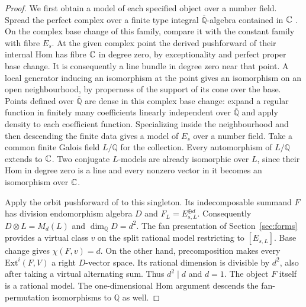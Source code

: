 \begin{proof}
We first obtain a model of each specified object over a number field. Spread the perfect complex over a finite type integral $\overline{\mathbb Q}$-algebra contained in $\mathbb C$ \cite[\S36.35]{Stacks}. On the complex base change of this family, compare it with the constant family with fibre $E_s$. At the given complex point the derived pushforward of their internal Hom has fibre $\mathbb C$ in degree zero, by exceptionality and perfect proper base change. It is consequently a line bundle in degree zero near that point. A local generator inducing an isomorphism at the point gives an isomorphism on an open neighbourhood, by properness of the support of its cone over the base. Points defined over $\overline{\mathbb Q}$ are dense in this complex base change: expand a regular function in finitely many coefficients linearly independent over $\overline{\mathbb Q}$ and apply density to each coefficient function. Specializing inside the neighbourhood and then descending the finite data gives a model of $E_s$ over a number field. Take a common finite Galois field $L/\mathbb Q$ for the collection. Every automorphism of $L/\mathbb Q$ extends to $\mathbb C$. Two conjugate $L$-models are already isomorphic over $L$, since their Hom in degree zero is a line and every nonzero vector in it becomes an isomorphism over $\mathbb C$.

Apply the orbit pushforward of \cite[Proposition~2.14]{BDM} to this singleton. Its indecomposable summand $F$ has division endomorphism algebra $D$ and $F_L=E_{s,L}^{\oplus d}$. Consequently $D\otimes L=M_d(L)$ and $\dim_{\mathbb Q}D=d^2$. The fan presentation of Section~\ref{sec:forms} provides a virtual class $v$ on the split rational model restricting to $[E_{s,L}]$. Base change gives $\chi(F,v)=d$. On the other hand, precomposition makes every $\mathrm{Ext}^i(F,V)$ a right $D$-vector space. Its rational dimension is divisible by $d^2$, also after taking a virtual alternating sum. Thus $d^2\mid d$ and $d=1$. The object $F$ itself is a rational model. The one-dimensional Hom argument descends the fan-permutation isomorphisms to $\mathbb Q$ as well.


\end{proof}
